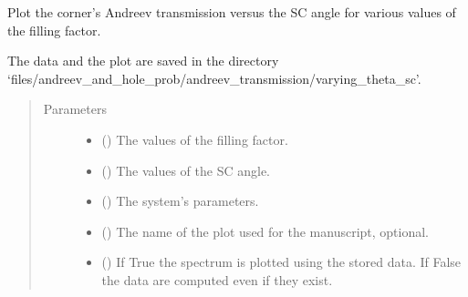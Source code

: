 \documentclass[letterpaper,10pt,english]{sphinxmanual}
\begin{document}

\begin{fulllineitems}
\label{\detokenize{modules:modules.utils.plot_tau_vs_theta_sc_various_fillings}}
\pysigstartsignatures
{}
\pysigstopsignatures
\sphinxAtStartPar
Plot the corner’s Andreev transmission versus the SC angle for various values of the filling factor.

\sphinxAtStartPar
The data and the plot are saved in the directory 
‘files/andreev\_and\_hole\_prob/andreev\_transmission/varying\_theta\_sc’.
\begin{quote}\begin{description}
\item[{Parameters}] \leavevmode\begin{itemize}
\item {} 
\sphinxAtStartPar
{} () \textendash{} The values of the filling factor.

\item {} 
\sphinxAtStartPar
{} () \textendash{} The values of the SC angle.

\item {} 
\sphinxAtStartPar
{} () \textendash{} The system’s parameters.

\item {} 
\sphinxAtStartPar
{} () \textendash{} The name of the plot used for the manuscript, optional.

\item {} 
\sphinxAtStartPar
{} () \textendash{} If True the spectrum is plotted using the stored data.
If False the data are computed even if they exist.

\end{itemize}

\end{description}\end{quote}

\end{fulllineitems}
\end{document}
